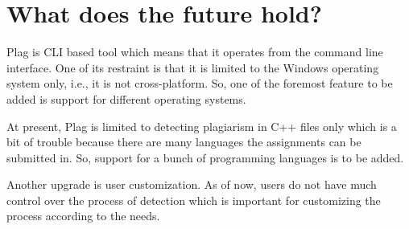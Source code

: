 \documentclass[12pt]{article}
\begin{document}








\section{What does the future hold?}
Plag is CLI based tool which means that it operates from the command line interface. One of its restraint is that it is limited to the Windows operating system only, i.e., it is not cross-platform. So, one of the foremost feature to be added is
support for different operating systems. \par
At present, Plag is limited to detecting plagiarism in C++ files only which is a bit of trouble because there are many languages the assignments can be submitted in. So, support for a bunch of programming languages is to be added. \par
Another upgrade is user customization. As of now, users do not have much control over the process of detection which is important for customizing the process according to the needs.

\end{document}
